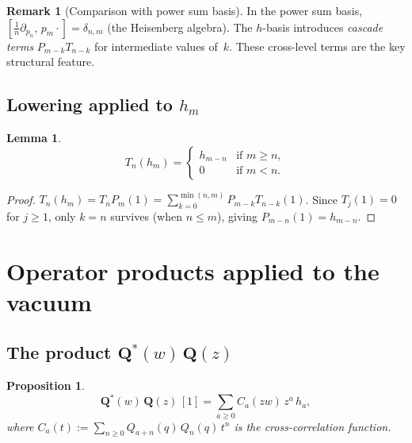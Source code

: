 \documentclass[11pt]{article}
\theoremstyle{plain}
\newtheorem{proposition}[theorem]{Proposition}
\newtheorem{lemma}[theorem]{Lemma}
\theoremstyle{definition}
\newtheorem{remark}[theorem]{Remark}
\begin{document}
\begin{remark}[Comparison with power sum basis]
In the power sum basis, $[\frac{1}{n}\partial_{p_n},\, p_m \cdot]
= \delta_{n,m}$ (the Heisenberg algebra).  The $h$-basis introduces
\emph{cascade terms} $P_{m-k} T_{n-k}$ for intermediate values
of~$k$.  These cross-level terms are the key structural feature.
\end{remark}


\subsection{Lowering applied to $h_m$}

\begin{lemma}\label{lem:Tn-hm}
\begin{equation}\label{eq:Tn-hm}
  T_n(h_m) =
  \begin{cases}
    h_{m-n} & \text{if } m \geq n, \\
    0 & \text{if } m < n.
  \end{cases}
\end{equation}
\end{lemma}

\begin{proof}
$T_n(h_m) = T_n P_m(1) = \sum_{k=0}^{\min(n,m)} P_{m-k} T_{n-k}(1)$.
Since $T_j(1) = 0$ for $j \geq 1$, only $k = n$ survives
(when $n \leq m$), giving $P_{m-n}(1) = h_{m-n}$.
\end{proof}


\section{Operator products applied to the vacuum}
\label{sec:products}

\subsection{The product $\mathbf{Q}^*(w)\,\mathbf{Q}(z)$}

\begin{proposition}\label{prop:QstarQ}
\begin{equation}\label{eq:QstarQ-vacuum}
  \mathbf{Q}^*(w)\,\mathbf{Q}(z)\,[1]
  = \sum_{a \geq 0} C_a(zw)\, z^a\, h_a,
\end{equation}
where $C_a(t) := \sum_{n \geq 0} Q_{a+n}(q)\, Q_n(q)\, t^n$ is
the cross-correlation function.
\end{proposition}
\end{document}
